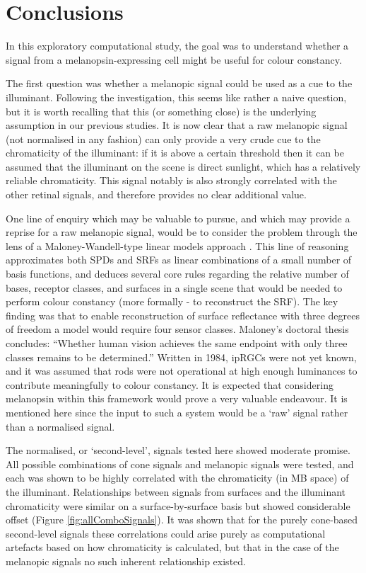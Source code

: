 
\section{Conclusions}

In this exploratory computational study, the goal was to understand whether a signal from a melanopsin-expressing cell might be useful for colour constancy.

The first question was whether a melanopic signal could be used as a cue to the illuminant. Following the investigation, this seems like rather a naive question, but it is worth recalling that this (or something close) is the underlying assumption in our previous studies. It is now clear that a raw melanopic signal (not normalised in any fashion) can only provide a very crude cue to the chromaticity of the illuminant: if it is above a certain threshold then it can be assumed that the illuminant on the scene is direct sunlight, which has a relatively reliable chromaticity. This signal notably is also strongly correlated with the other retinal signals, and therefore provides no clear additional value.

One line of enquiry which may be valuable to pursue, and which may provide a reprise for a raw melanopic signal, would be to consider the problem through the lens of a Maloney-Wandell-type linear models approach \citep{maloney_computational_1984,maloney_color_1986}. This line of reasoning approximates both \glspl{SPD} and \glspl{SRF} as linear combinations of a small number of basis functions, and deduces several core rules regarding the relative number of bases, receptor classes, and surfaces in a single scene that would be needed to perform colour constancy (more formally - to reconstruct the \gls{SRF}). The key finding was that to enable reconstruction of surface reflectance with three degrees of freedom a model would require four sensor classes. Maloney's doctoral thesis concludes: ``Whether human vision achieves the same endpoint with only three classes remains to be determined.'' Written in 1984, \glspl{ipRGC} were not yet known, and it was assumed that rods were not operational at high enough luminances to contribute meaningfully to colour constancy. It is expected that considering melanopsin within this framework would prove a very valuable endeavour. It is mentioned here since the input to such a system would be a `raw' signal rather than a normalised signal.

The normalised, or `second-level', signals tested here showed moderate promise. All possible combinations of cone signals and melanopic signals were tested, and each was shown to be highly correlated with the chromaticity (in \gls{MB} space) of the illuminant. Relationships between signals from surfaces and the illuminant chromaticity were similar on a surface-by-surface basis but showed considerable offset (Figure \ref{fig:allComboSignals}). It was shown that for the purely cone-based second-level signals these correlations could arise purely as computational artefacts based on how chromaticity is calculated, but that in the case of the melanopic signals no such inherent relationship existed.


